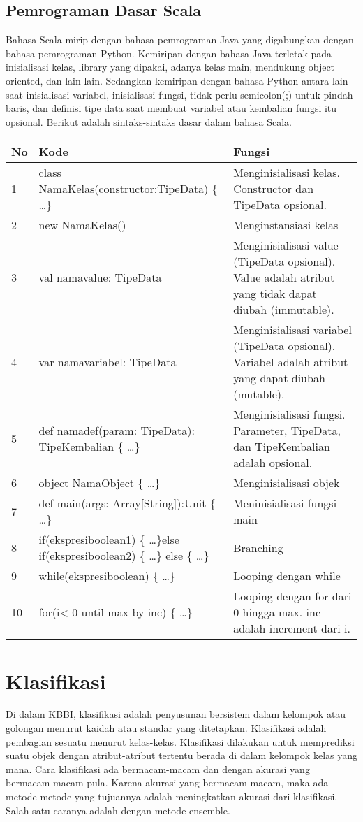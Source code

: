 \subsection{Pemrograman Dasar Scala}
Bahasa Scala mirip dengan bahasa pemrograman Java yang digabungkan dengan bahasa pemrograman Python. Kemiripan dengan bahasa Java terletak pada inisialisasi kelas, library yang dipakai, adanya kelas main, mendukung object oriented, dan lain-lain. Sedangkan kemiripan dengan bahasa Python antara lain saat inisialisasi variabel, inisialisasi fungsi, tidak perlu semicolon(;) untuk pindah baris, dan definisi tipe data saat membuat variabel atau kembalian fungsi itu opsional. Berikut adalah sintaks-sintaks dasar dalam bahasa Scala.\\
\begin{tabular}{|p{}|p{}|p{}|}
\hline 
No & Kode & Fungsi \\ 
\hline 
1 & class NamaKelas(constructor:TipeData) \{ \ldots \} & Menginisialisasi kelas. Constructor dan TipeData opsional. \\ 
\hline 
2 & new NamaKelas() & Menginstansiasi kelas \\ 
\hline 
3 & val namavalue: TipeData & Menginisialisasi value (TipeData opsional). Value adalah atribut yang tidak dapat diubah (immutable). \\ 
\hline 
4 & var namavariabel: TipeData & Menginisialisasi variabel (TipeData opsional). Variabel adalah atribut yang dapat diubah (mutable). \\ 
\hline 
5 & def namadef(param: TipeData): TipeKembalian \{ \ldots \} & Menginisialisasi fungsi. Parameter, TipeData, dan TipeKembalian adalah opsional.  \\ 
\hline 
6 & object NamaObject \{ \ldots \} & Menginisialisasi objek \\ 
\hline 
7 & def main(args: Array[String]):Unit \{ \ldots \} & Meninisialisasi fungsi main \\ 
\hline 
8 & if(ekspresiboolean1) \{ \ldots \}else if(ekspresiboolean2) \{ \ldots \} else \{ \ldots \} & Branching \\ 
\hline 
9 & while(ekspresiboolean) \{ \ldots \} & Looping dengan while \\ 
\hline 
10 & for(i<-0 until max by inc) \{ \ldots \} & Looping dengan for dari 0 hingga max. inc adalah increment dari i. \\ 
\hline 
\end{tabular} 


\section{Klasifikasi}
\label{sec:klasifikasi}
Di dalam KBBI, klasifikasi adalah penyusunan bersistem dalam kelompok atau golongan menurut kaidah atau standar yang ditetapkan. Klasifikasi adalah pembagian sesuatu menurut kelas-kelas. Klasifikasi dilakukan untuk memprediksi suatu objek dengan atribut-atribut tertentu berada di dalam kelompok kelas yang mana. Cara klasifikasi ada bermacam-macam dan dengan akurasi yang bermacam-macam pula. Karena akurasi yang bermacam-macam, maka ada metode-metode yang tujuannya adalah meningkatkan akurasi dari klasifikasi. Salah satu caranya adalah dengan metode ensemble.

